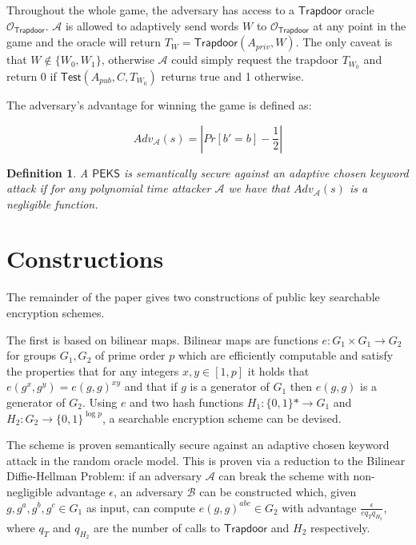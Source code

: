 \documentclass[a4paper,11pt]{article}
\newtheorem{definition}{Definition}
\begin{document}
    Throughout the whole game, the adversary has access to a $\mathsf{Trapdoor}$ oracle $\mathcal{O}_{\mathsf{Trapdoor}}$. $\mathcal{A}$ is allowed to adaptively send words $W$ to $\mathcal{O}_{\mathsf{Trapdoor}}$ at any point in the game and the oracle will return $T_W = \mathsf{Trapdoor}(A_{priv}, W)$. The only caveat is that $W \notin \{W_0, W_1\}$, otherwise $\mathcal{A}$ could simply request the trapdoor $T_{W_0}$ and return 0 if $\mathsf{Test}(A_{pub}, C, T_{W_0})$ returns true and 1 otherwise.

    The adversary's advantage for winning the game is defined as:

    $$Adv_{\mathcal{A}}(s) = |Pr[b' = b] - \frac{1}{2}|$$

    \begin{definition}
        A $\mathsf{PEKS}$ is semantically secure against an adaptive chosen keyword attack if for any polynomial time attacker $\mathcal{A}$ we have that $Adv_{\mathcal{A}}(s)$ is a negligible function.
    \end{definition}

    \section{Constructions}

    The remainder of the paper gives two constructions of public key searchable encryption schemes.

    The first is based on bilinear maps. Bilinear maps are functions $e:G_1 \times G_1 \to G_2$ for groups $G_1, G_2$ of prime order $p$ which are efficiently computable and satisfy the properties that for any integers $x, y \in [1,p]$ it holds that $e(g^x, g^y) = e(g, g)^{xy}$ and that if $g$ is a generator of $G_1$ then $e(g, g)$ is a generator of $G_2$. Using $e$ and two hash functions $H_1: \{0, 1\}* \to G_1$ and $H_2: G_2 \to \{0, 1\}^{\log p}$, a searchable encryption scheme can be devised.

    The scheme is proven semantically secure against an adaptive chosen keyword attack in the random oracle model. This is proven via a reduction to the Bilinear Diffie-Hellman Problem: if an adversary $\mathcal{A}$ can break the scheme with non-negligible advantage $\epsilon$, an adversary $\mathcal{B}$ can be constructed which, given $g, g^a, g^b, g^c \in G_1$ as input, can compute $e(g, g)^{abc} \in G_2$ with advantage $\frac{\epsilon}{eq_Tq_{H_2}}$, where $q_T$ and $q_{H_2}$ are the number of calls to $\mathsf{Trapdoor}$ and $H_2$ respectively.
\end{document}
